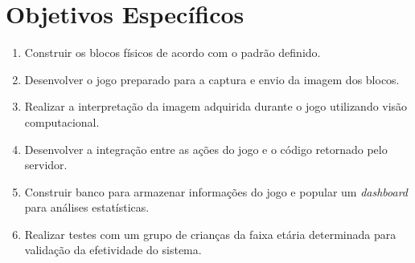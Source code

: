 \section{Objetivos Específicos}

\begin{enumerate}
\item Construir os blocos físicos de acordo com o padrão definido.
\item Desenvolver o jogo preparado para a captura e envio da imagem dos blocos.
\item Realizar a interpretação da imagem adquirida durante o jogo utilizando visão computacional.
\item Desenvolver a integração entre as ações do jogo e o código retornado pelo servidor.
\item Construir banco para armazenar informações do jogo e popular um \textit{dashboard} para análises estatísticas.
\item Realizar testes com um grupo de crianças da faixa etária determinada para validação da efetividade do sistema.
\end{enumerate}
